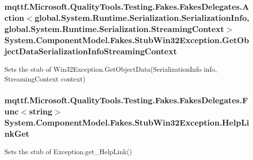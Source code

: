 \hypertarget{class_system_1_1_component_model_1_1_fakes_1_1_stub_win32_exception_aec95b522ae0f0a9dcc2ec919633f25e1}{
\subsubsection[{Get\-Object\-Data\-Serialization\-Info\-Streaming\-Context}]{\setlength{\rightskip}{0pt plus 5cm}mqttf.\-Microsoft.\-Quality\-Tools.\-Testing.\-Fakes.\-Fakes\-Delegates.\-Action$<$global.\-System.\-Runtime.\-Serialization.\-Serialization\-Info, global.\-System.\-Runtime.\-Serialization.\-Streaming\-Context$>$ System.\-Component\-Model.\-Fakes.\-Stub\-Win32\-Exception.\-Get\-Object\-Data\-Serialization\-Info\-Streaming\-Context}}\label{class_system_1_1_component_model_1_1_fakes_1_1_stub_win32_exception_aec95b522ae0f0a9dcc2ec919633f25e1}


Sets the stub of Win32\-Exception.\-Get\-Object\-Data(\-Serialization\-Info info, Streaming\-Context context)

\hypertarget{class_system_1_1_component_model_1_1_fakes_1_1_stub_win32_exception_a7a3c2f89ab88b22c1094e2c111bf5445}{
\subsubsection[{Help\-Link\-Get}]{\setlength{\rightskip}{0pt plus 5cm}mqttf.\-Microsoft.\-Quality\-Tools.\-Testing.\-Fakes.\-Fakes\-Delegates.\-Func$<$string$>$ System.\-Component\-Model.\-Fakes.\-Stub\-Win32\-Exception.\-Help\-Link\-Get}}\label{class_system_1_1_component_model_1_1_fakes_1_1_stub_win32_exception_a7a3c2f89ab88b22c1094e2c111bf5445}


Sets the stub of Exception.\-get\-\_\-\-Help\-Link()

